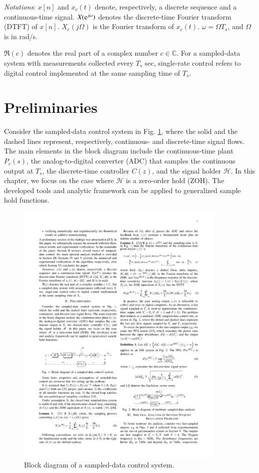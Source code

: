 \documentclass [11pt, proquest] {uwthesis}[2020/02/24]
\begin{document}
\emph{Notations}: \label{sec:We-use-the}$x\left[n\right]$ and $x_{c}\left(t\right)$
denote, respectively, a discrete sequence and a continuous-time signal.
$X(\mathrm{e}^{j\omega})$ denotes the discrete-time Fourier transform (DTFT)
of $x\left[n\right]$. $X_{c}(j\Omega)$ is the Fourier transform
of $x_{c}\left(t\right)$. $\omega=\Omega T_{s}$, and $\Omega$ is
in rad/s. 

$\Re(c)$ denotes the real part of a complex number $c\in\mathbb{C}$.
For a sampled-data system with measurements collected every $T_{s}$
sec, single-rate control refers to digital control implemented at
the same sampling time of $T_{s}$.

\section{Preliminaries} \label{sec:Problem-Formulation}

Consider the sampled-data control system in Fig. \ref{fig:Block-diagram-of},
where the solid and the dashed lines represent, respectively, continuous-
and discrete-time signal flows. The main elements in the block diagram
include the continuous-time plant $P_{c}\left(s\right)$, the analog-to-digital
converter (ADC) that samples the continuous output at $T_{s}$, the
discrete-time controller $C\left(z\right)$, and the signal holder
$\mathscr{H}$. In this chapter, we focus on the case where $\mathscr{H}$
is a zero-order hold (ZOH). The developed tools and analytic framework
can be applied to generalized sample hold functions.
\begin{figure}[!ht]
\begin{centering}
\includegraphics[width=10cm]{Spectral-analysis/FIG1.pdf}
\par\end{centering}
\caption{\label{fig:Block-diagram-of}Block diagram of a sampled-data control
system.}
\end{figure}
\end{document}
